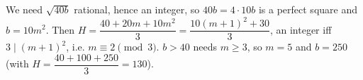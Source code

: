 We need $\sqrt{40b}$ rational, hence an integer, so $40b=4\cdot10b$ is a perfect square and $b=10m^2$. Then $H=\dfrac{40+20m+10m^2}3=\dfrac{10(m+1)^2+30}3$, an integer iff $3\mid(m+1)^2$, i.e. $m\equiv2\pmod3$. $b>40$ needs $m\ge3$, so $m=5$ and $b=\boxed{250}$ (with $H=\dfrac{40+100+250}3=130$).
